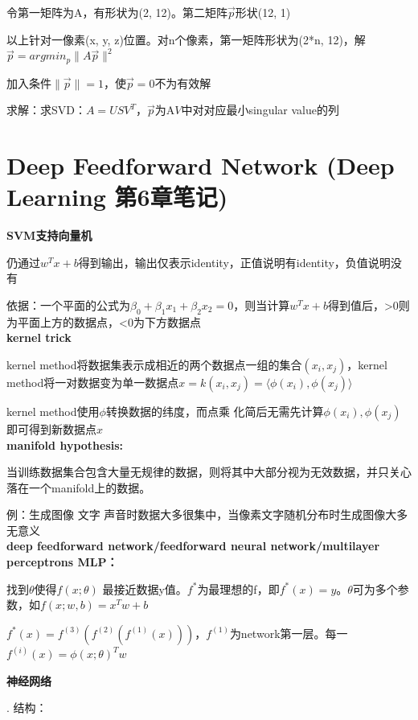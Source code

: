 \documentclass[UTF8]{ctexart}
\begin{document}
  \quad \quad 令第一矩阵为A，有形状为(2, 12)。第二矩阵$\vec{p}$形状(12, 1)

  \quad 以上针对一像素(x, y, z)位置。对n个像素，第一矩阵形状为(2*n, 12)，解$\vec{p} = argmin_p \|A\vec{p}\|^2$

  \quad \quad 加入条件$\|\vec{p}\| = 1$，使$\vec{p} = 0$不为有效解

  \quad \quad 求解：求SVD：$A = USV^T$，$\vec{p}$为A$V$中对对应最小singular value的列


\section{Deep Feedforward Network (Deep Learning 第6章笔记)}
\noindent \textbf{SVM支持向量机}

  仍通过$w^Tx+b$得到输出，输出仅表示identity，正值说明有identity，负值说明没有

  依据：一个平面的公式为$\beta_0+\beta_1x_1+\beta_2x_2=0$，则当计算$w^Tx+b$得到值后，>0则为平面上方的数据点，<0为下方数据点\\
\textbf{kernel trick}

  kernel method将数据集表示成相近的两个数据点一组的集合$(x_i, x_j)$，kernel method将一对数据变为单一数据点$x=k(x_i, x_j)=\langle \phi (x_i), \phi (x_j)\rangle $

  kernel method使用$\phi $转换数据的纬度，而点乘 化简后无需先计算$\phi (x_i), \phi (x_j)$即可得到新数据点$x$\\
\textbf{manifold hypothesis:}

  当训练数据集合包含大量无规律的数据，则将其中大部分视为无效数据，并只关心落在一个manifold上的数据。

  例：生成图像 文字 声音时数据大多很集中，当像素文字随机分布时生成图像大多无意义\\
\textbf{deep feedforward network/feedforward neural network/multilayer perceptrons MLP：}

  找到$\theta$使得$f(x; \theta )$ 最接近数据y值。$f^*$为最理想的f，即$f^*(x) = y$。$\theta $可为多个参数，如$f(x; w, b) = x^Tw+b$

  $f^*(x) = f^{(3)}(f^{(2)}(f^{(1)}(x)))$，$f^{(1)}$为network第一层。每一$f^{(i)}(x) = \phi (x; \theta )^Tw$

  \textbf{神经网络}

  . 结构：
\end{document}
